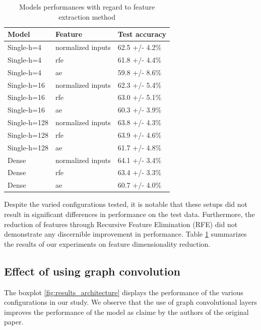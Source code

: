 \begin{table}[h!]
	\begin{center}
        \begin{tabular}{lll}
            Model & Feature & Test accuracy \\
            \hline
            Single-h=4 & normalized inputs & 62.5 +/- 4.2\% \\
            Single-h=4 & rfe & 61.8 +/- 4.4\% \\
            Single-h=4 & ae & 59.8 +/- 8.6\% \\
            Single-h=16 & normalized inputs & 62.3 +/- 5.4\% \\
            Single-h=16 & rfe & 63.0 +/- 5.1\% \\
            Single-h=16 & ae & 60.3 +/- 3.9\% \\
            Single-h=128 & normalized inputs & 63.8 +/- 4.3\% \\
            Single-h=128 & rfe & 63.9 +/- 4.6\% \\
            Single-h=128 & ae & 61.7 +/- 4.8\% \\
            Dense & normalized inputs & 64.1 +/- 3.4\% \\
            Dense & rfe & 63.4 +/- 3.3\% \\
            Dense & ae & 60.7 +/- 4.0\% \\
        \end{tabular}
    \end{center}
    \caption{Models performances with regard to feature extraction method}
    \label{table:dependance_on_feature_extraction_method}
\end{table}

Despite the varied configurations tested, it is notable that these setups did not result in significant differences in performance on the test data. Furthermore, the reduction of features through Recursive Feature Elimination (RFE) did not demonstrate any discernible improvement in performance.
Table \ref{table:dependance_on_feature_extraction_method} summarizes the results of our experiments on feature dimensionality reduction.

\subsection{Effect of using graph convolution}

The boxplot \ref{fig:results_architecture} displays the performance of the various configurations in our study. We observe that the use of graph convolutional layers improves the performance of the model as claime by the authors of the original paper.


